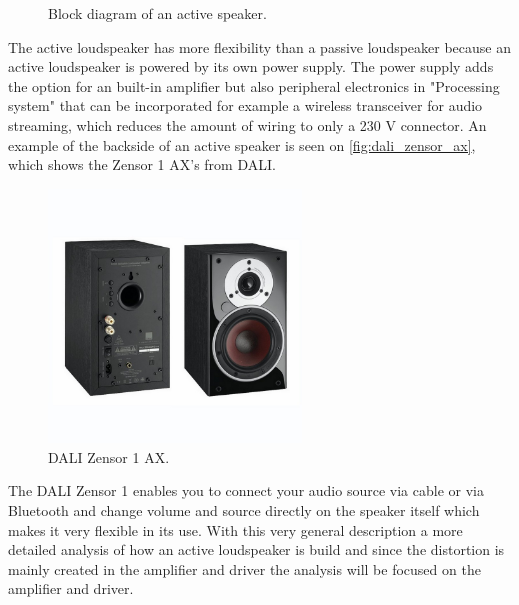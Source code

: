 \begin{figure}[H]
\centering
{}
\scalebox{0.9}{
}
\caption{Block diagram of an active speaker.}
\label{fig:speaker_block}
\end{figure}
The active loudspeaker has more flexibility than a passive loudspeaker because an active loudspeaker is powered by its own power supply. The power supply adds the option for an built-in amplifier but also peripheral electronics in "Processing system" that can be incorporated for example a wireless transceiver for audio streaming, which reduces the amount of wiring to only a 230 V connector. An example of the backside of an active speaker is seen on \autoref{fig:dali_zensor_ax}, which shows the Zensor 1 AX's from DALI.
\begin{figure}[H]
\centering
\includegraphics[width=0.6\textwidth]{figures/dali_zensor_1_ax.jpg}
\caption{DALI Zensor 1 AX.}
\label{fig:dali_zensor_ax}
\end{figure}
The DALI Zensor 1 enables you to connect your audio source via cable or via Bluetooth and change volume and source directly on the speaker itself which makes it very flexible in its use. With this very general description a more detailed analysis of how an active loudspeaker is build and since the distortion is mainly created in the amplifier and driver the analysis will be focused on the amplifier and driver.









